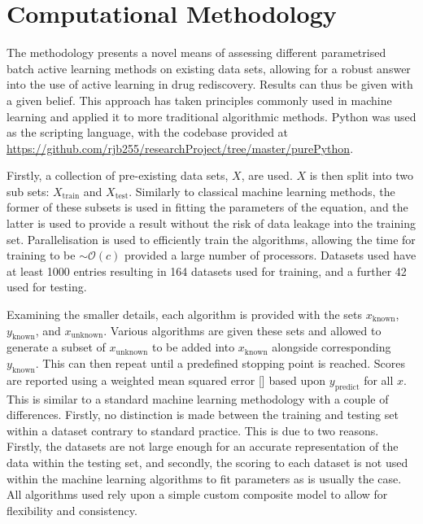 
\section{Computational Methodology}
The methodology presents a novel means of assessing different parametrised batch active learning methods on existing data sets, allowing for a robust answer into the use of active learning in drug rediscovery. Results can thus be given with a given belief. This approach has taken principles commonly used in machine learning and applied it to more traditional algorithmic methods. Python was used as the scripting language, with the codebase provided at \url{https://github.com/rjb255/researchProject/tree/master/purePython}.

Firstly, a collection of pre-existing data sets, $X$, are used. $X$ is then split into two sub sets: $X_{\mathrm{train}}$ and $X_\mathrm{test}$. Similarly to classical machine learning methods, the former of these subsets is used in fitting the parameters of the equation, and the latter is used to provide a result without the risk of data leakage into the training set. Parallelisation is used to efficiently train the algorithms, allowing the time for training to be $\sim{}\mathcal{O}(c)$ provided a large number of processors. Datasets used have at least 1000 entries resulting in 164 datasets used for training, and a further 42 used for testing.

Examining the smaller details, each algorithm is provided with the sets $x_\mathrm{known}$, $y_\mathrm{known}$, and $x_\mathrm{unknown}$. Various algorithms are given these sets and allowed to generate a subset of $x_\mathrm{unknown}$ to be added into $x_\mathrm{known}$ alongside corresponding $y_\mathrm{known}$. This can then repeat until a predefined stopping point is reached. Scores are reported using a weighted mean squared error [] based upon $y_\mathrm{predict}$ for all $x$. This is similar to a standard machine learning methodology with a couple of differences. Firstly, no distinction is made between the training and testing set within a dataset contrary to standard practice. This is due to two reasons. Firstly, the datasets are not large enough for an accurate representation of the data within the testing set, and secondly, the scoring to each dataset is not used within the machine learning algorithms to fit parameters as is usually the case. All algorithms used rely upon a simple custom composite model to allow for flexibility and consistency.


